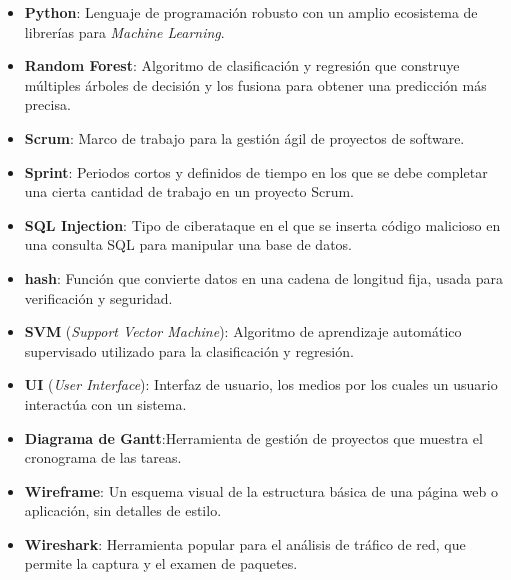 \begin{itemize}
\item \textbf{Python}: Lenguaje de programación robusto con un amplio ecosistema de librerías para \textit{Machine Learning}.

\item \textbf{Random Forest}: Algoritmo de clasificación y regresión que construye múltiples árboles de decisión y los fusiona para obtener una predicción más precisa.

\item \textbf{Scrum}: Marco de trabajo para la gestión ágil de proyectos de software.
\item \textbf{Sprint}: Periodos cortos y definidos de tiempo en los que se debe completar una cierta cantidad de trabajo en un proyecto Scrum.

\item \textbf{SQL Injection}: Tipo de ciberataque en el que se inserta código malicioso en una consulta SQL para manipular una base de datos.
\item\textbf{hash}: Función que convierte datos en una cadena de longitud fija, usada para verificación y seguridad.
\item \textbf{SVM} (\textit{Support Vector Machine}): Algoritmo de aprendizaje automático supervisado utilizado para la clasificación y regresión.

\item \textbf{UI} (\textit{User Interface}): Interfaz de usuario, los medios por los cuales un usuario interactúa con un sistema.

\item\textbf{Diagrama de Gantt}:Herramienta de gestión de proyectos que muestra el cronograma de las tareas.
\item \textbf{Wireframe}: Un esquema visual de la estructura básica de una página web o aplicación, sin detalles de estilo.

\item \textbf{Wireshark}: Herramienta popular para el análisis de tráfico de red, que permite la captura y el examen de paquetes.

\end{itemize}
